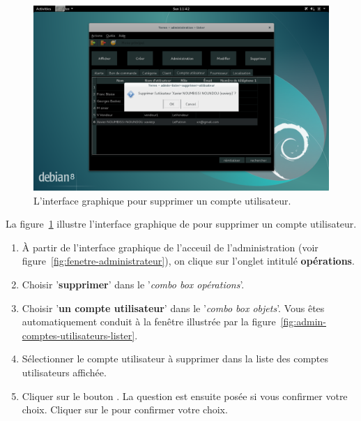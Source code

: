 
\newpage
{}

\begin{figure}[!htpb]
	\centering
	\includegraphics[scale=0.39]{images/compte-utilisateur-supprimer.png}
	\caption{L'interface graphique pour supprimer un compte utilisateur.}
	\label{fig:admin-comptes-utilisateurs-supprimer}
\end{figure}

La figure~\ref{fig:admin-comptes-utilisateurs-supprimer}
illustre l'interface graphique de \yeren pour supprimer
un compte utilisateur.

\begin{enumerate}[1)]
	\item \`A partir de l'interface graphique de l'acceuil de
		l'administration (voir figure~\ref{fig:fenetre-administrateur}),
		on clique sur l'onglet intitul\'e \textbf{op\'erations}. 
		
	\item Choisir '\textbf{supprimer}' dans le '\emph{combo box
		op\'erations}'.
		
	\item Choisir '\textbf{un compte utilisateur}' dans le
		'\emph{combo box objets}'. Vous \^etes automatiquement
		conduit \`a la fen\^etre illustr\'ee par la
		figure~\ref{fig:admin-comptes-utilisateurs-lister}.
		
	\item S\'electionner le compte utilisateur \`a supprimer
		dans la liste des comptes utilisateurs affich\'ee.
		
	\item Cliquer sur le bouton . La question
		est ensuite pos\'ee si vous confirmer votre choix.
		Cliquer sur le  pour confirmer votre choix.
\end{enumerate}
